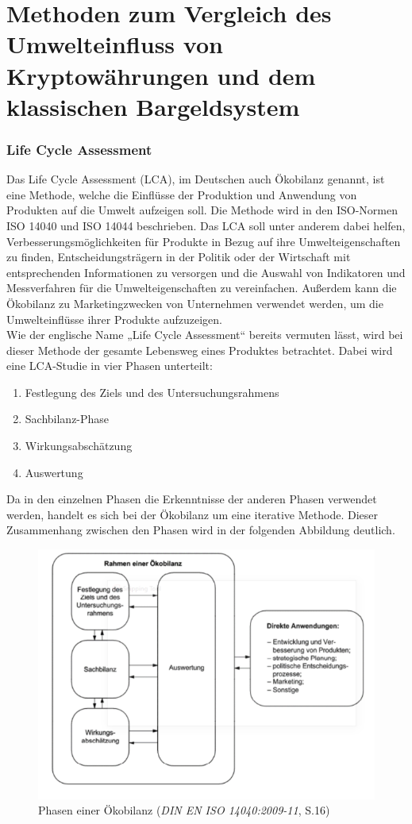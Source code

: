 \documentclass[12pt]{article}
\begin{document}
\part{Methoden zum Vergleich des Umwelteinfluss von Kryptowährungen und dem klassischen Bargeldsystem}

\section{Life Cycle Assessment}
Das Life Cycle Assessment (LCA), im Deutschen auch Ökobilanz genannt, ist eine Methode, welche die Einflüsse der Produktion und Anwendung von Produkten auf die Umwelt aufzeigen soll. Die Methode wird in den ISO-Normen ISO 14040 und ISO 14044 beschrieben. Das LCA soll unter anderem dabei helfen, Verbesserungsmöglichkeiten für Produkte in Bezug auf ihre Umwelteigenschaften zu finden, Entscheidungsträgern in der Politik oder der Wirtschaft mit entsprechenden Informationen zu versorgen und die Auswahl von Indikatoren und Messverfahren für die Umwelteigenschaften zu vereinfachen. Außerdem kann die Ökobilanz zu Marketingzwecken von Unternehmen verwendet werden, um die Umwelteinflüsse ihrer Produkte aufzuzeigen.\\
Wie der englische Name „Life Cycle Assessment“ bereits vermuten lässt, wird bei dieser Methode der gesamte Lebensweg eines Produktes betrachtet. Dabei wird eine LCA-Studie in vier Phasen unterteilt:
\begin{enumerate}
    \item Festlegung des Ziels und des Untersuchungsrahmens
    \item Sachbilanz-Phase
    \item Wirkungsabschätzung
    \item Auswertung
\end{enumerate}
Da in den einzelnen Phasen die Erkenntnisse der anderen Phasen verwendet werden, handelt es sich bei der Ökobilanz um eine iterative Methode. Dieser Zusammenhang zwischen den Phasen wird in der folgenden Abbildung deutlich.
\FloatBarrier
\begin{figure}[ht!]
    \centering
    \includegraphics[width=.75\textwidth]{quellen/oekobilanz.png}
    \caption[Phasen einer Ökobilanz]{Phasen einer Ökobilanz (\textit{DIN EN ISO 14040:2009-11}, S.16)}
\end{figure}
\FloatBarrier
\end{document}
